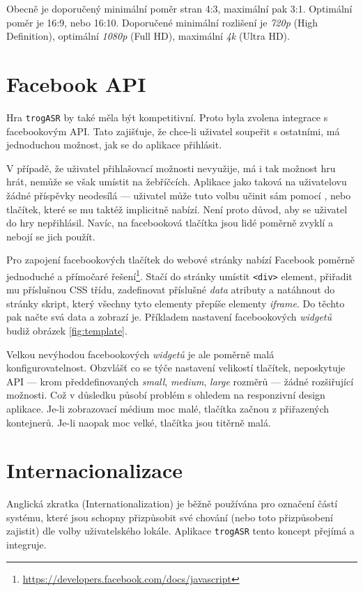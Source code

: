 Obecně je doporučený minimální poměr stran 4:3, maximální pak 3:1. Optimální poměr je 16:9, nebo 16:10. Doporučené minimální rozlišení je {\sl 720p } (High Definition), optimální {\sl 1080p } (Full HD), maximální {\sl 4k } (Ultra HD).

\section{Facebook API}

Hra \verb|trogASR| by také měla být kompetitivní. Proto byla zvolena integrace s facebookovým API. Tato zajišťuje, že chce-li uživatel soupeřit s ostatními, má jednoduchou možnost, jak se do aplikace přihlásit.

V případě, že uživatel přihlašovací možnosti nevyužije, má i tak možnost hru hrát, nemůže se však umístit na žebříčcích. Aplikace jako taková na uživatelovu  žádné příspěvky neodesílá --- uživatel může tuto volbu učinit sám pomocí , nebo  tlačítek, které se mu taktéž implicitně nabízí. Není proto důvod, aby se uživatel do hry nepřihlásil. Navíc, na facebooková tlačítka jsou lidé poměrně zvyklí a nebojí se jich použít.

Pro zapojení facebookových tlačítek do webové stránky nabízí Facebook poměrně jednoduché a přímočaré řešení\footnote{\url{https://developers.facebook.com/docs/javascript}}. Stačí do stránky umístit \verb|<div>| element, přiřadit mu příslušnou CSS třídu, zadefinovat příslušné {\sl data} atributy a natáhnout do stránky skript, který všechny tyto elementy přepíše elementy {\sl iframe}. Do těchto pak načte svá data a zobrazí je. Příkladem nastavení facebookových {\sl widgetů} budiž obrázek \ref{fig:template}.

Velkou nevýhodou facebookových {\sl widgetů} je ale poměrně malá konfigurovatelnost. Obzvlášť co se týče nastavení velikostí tlačítek, neposkytuje API --- krom předdefinovaných {\sl small}, {\sl medium}, {\sl large} rozměrů --- žádné rozšiřující možnosti. Což v důsledku působí problém s ohledem na responzivní design aplikace. Je-li zobrazovací médium moc malé, tlačítka začnou  z přiřazených kontejnerů. Je-li naopak moc velké, tlačítka jsou titěrně malá.

\section{Internacionalizace}

Anglická zkratka  (Internationalization) je běžně používána pro označení částí systému, které jsou schopny přizpůsobit své chování (nebo toto přizpůsobení zajistit) dle volby uživatelského lokále. Aplikace \verb|trogASR| tento koncept přejímá a integruje.

